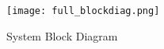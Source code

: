\begin{figure}[H] 
	\centerline{
	\texttt{[image: full\_blockdiag.png]}
	}
	\caption{System Block Diagram}
	\label{systemBD}
\end{figure}